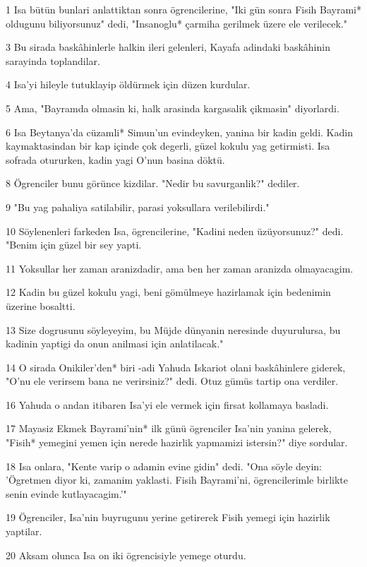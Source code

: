 \par 1 Isa bütün bunlari anlattiktan sonra ögrencilerine, "Iki gün sonra Fisih Bayrami* oldugunu biliyorsunuz" dedi, "Insanoglu* çarmiha gerilmek üzere ele verilecek."
\par 3 Bu sirada baskâhinlerle halkin ileri gelenleri, Kayafa adindaki baskâhinin sarayinda toplandilar.
\par 4 Isa'yi hileyle tutuklayip öldürmek için düzen kurdular.
\par 5 Ama, "Bayramda olmasin ki, halk arasinda kargasalik çikmasin" diyorlardi.
\par 6 Isa Beytanya'da cüzamli* Simun'un evindeyken, yanina bir kadin geldi. Kadin kaymaktasindan bir kap içinde çok degerli, güzel kokulu yag getirmisti. Isa sofrada otururken, kadin yagi O'nun basina döktü.
\par 8 Ögrenciler bunu görünce kizdilar. "Nedir bu savurganlik?" dediler.
\par 9 "Bu yag pahaliya satilabilir, parasi yoksullara verilebilirdi."
\par 10 Söylenenleri farkeden Isa, ögrencilerine, "Kadini neden üzüyorsunuz?" dedi. "Benim için güzel bir sey yapti.
\par 11 Yoksullar her zaman aranizdadir, ama ben her zaman aranizda olmayacagim.
\par 12 Kadin bu güzel kokulu yagi, beni gömülmeye hazirlamak için bedenimin üzerine bosaltti.
\par 13 Size dogrusunu söyleyeyim, bu Müjde dünyanin neresinde duyurulursa, bu kadinin yaptigi da onun anilmasi için anlatilacak."
\par 14 O sirada Onikiler'den* biri -adi Yahuda Iskariot olani baskâhinlere giderek, "O'nu ele verirsem bana ne verirsiniz?" dedi. Otuz gümüs tartip ona verdiler.
\par 16 Yahuda o andan itibaren Isa'yi ele vermek için firsat kollamaya basladi.
\par 17 Mayasiz Ekmek Bayrami'nin* ilk günü ögrenciler Isa'nin yanina gelerek, "Fisih* yemegini yemen için nerede hazirlik yapmamizi istersin?" diye sordular.
\par 18 Isa onlara, "Kente varip o adamin evine gidin" dedi. "Ona söyle deyin: 'Ögretmen diyor ki, zamanim yaklasti. Fisih Bayrami'ni, ögrencilerimle birlikte senin evinde kutlayacagim.'"
\par 19 Ögrenciler, Isa'nin buyrugunu yerine getirerek Fisih yemegi için hazirlik yaptilar.
\par 20 Aksam olunca Isa on iki ögrencisiyle yemege oturdu.
